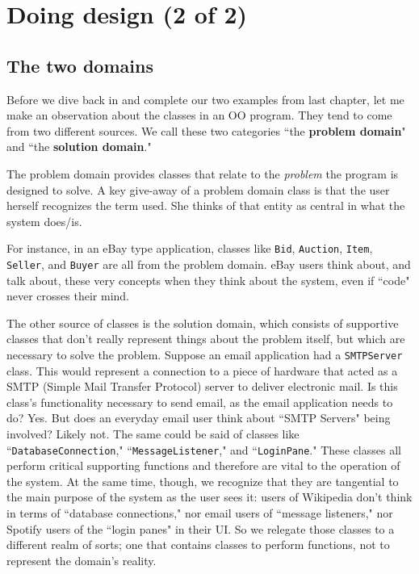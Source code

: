 
\chapter{Doing design (2 of 2)}

\section{The two domains}

Before we dive back in and complete our two examples from last chapter, let me
make an observation about the classes in an OO program. They tend to come from
two different sources. We call these two categories ``the \textbf{problem
domain}" and ``the \textbf{solution domain}."

The problem domain provides classes that relate to the \textit{problem} the
program is designed to solve. A key give-away of a problem domain class is
that the user herself recognizes the term used. She thinks of that entity as
central in what the system does/is.

For instance, in an eBay type application, classes like \texttt{Bid},
\texttt{Auction}, \texttt{Item}, \texttt{Seller}, and \texttt{Buyer} are all
from the problem domain. eBay users think about, and talk about, these very
concepts when they think about the system, even if ``code" never crosses their
mind.

The other source of classes is the solution domain, which consists of
supportive classes that don't really represent things about the problem
itself, but which are necessary to solve the problem. Suppose an email
application had a \texttt{SMTPServer} class. This would represent a connection
to a piece of hardware that acted as a SMTP (Simple Mail Transfer Protocol)
server to deliver electronic mail. Is this class's functionality necessary to
send email, as the email application needs to do? Yes. But does an everyday
email user think about ``SMTP Servers" being involved? Likely not. The same
could be said of classes like ``\texttt{DatabaseConnection},"
``\texttt{MessageListener}," and ``\texttt{LoginPane}."  These classes all
perform critical supporting functions and therefore are vital to the operation
of the system. At the same time, though, we recognize that they are tangential
to the main purpose of the system as the user sees it: users of Wikipedia
don't think in terms of ``database connections," nor email users of ``message
listeners," nor Spotify users of the ``login panes" in their UI. So we
relegate those classes to a different realm of sorts; one that contains
classes to perform functions, not to represent the domain's reality.

